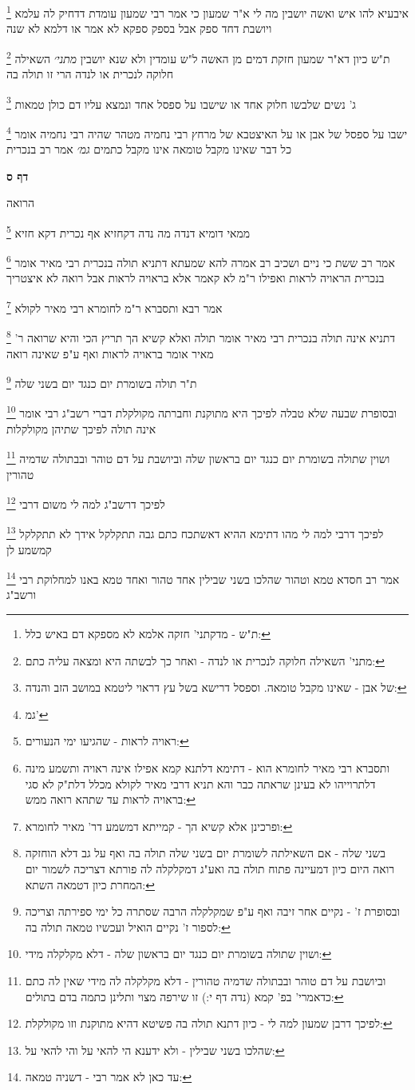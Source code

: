 \documentclass[12pt, openany]{book}
\newcommand{\sethebfont}{
\fontsize{10.5pt}{21.0pt} \selectfont
}
\newcommand{\twocol}[1]{
	{\sethebfont \begin{multicols}{2}
			#1
	\end{multicols}}	
}
\newcommand{\sectname}{}
\newcommand{\newsection}[1]{
	\renewcommand{\sectname}{#1}	
	\vspace{-\baselineskip}
	\begin{center}
		\textbf{%
\fontsize{16pt}{16pt}\selectfont
			#1}
	\end{center}
	\vspace{-\baselineskip}
	\nopagebreak
}
\newcommand{\footnotecomment}[1]{
	\renewcommand\thefootnote{}
	\footnote{#1}}
\newcommand{\commenta}[1]{\footnotecomment{#1}}
\begin{document}
{{\commenta{ת"ש - מדקתני' חזקה אלמא לא מספקא דם באיש כלל:}
איבעיא להו איש ואשה יושבין מה לי א"ר שמעון כי אמר רבי שמעון עומדת דדחיק לה עלמא ויושבת דחד ספק אבל בספק ספקא לא אמר או דלמא לא שנה 
\commenta{מתני' השאילה חלוקה לנכרית או לנדה - ואחר כך לבשתה היא ומצאה עליה כתם:}
ת"ש כיון דא"ר שמעון חזקת דמים מן האשה ל"ש עומדין ולא שנא יושבין
{\large\emph{מתני׳}} השאילה חלוקה לנכרית או לנדה הרי זו תולה בה
\commenta{של אבן - שאינו מקבל טומאה. וספסל דרישא בשל עץ דראוי ליטמא במושב הזב והנדה:}
ג' נשים שלבשו חלוק אחד או שישבו על ספסל אחד ונמצא עליו דם כולן טמאות 
\commenta{גמ'}
ישבו על ספסל של אבן או על האיצטבא של מרחץ רבי נחמיה מטהר שהיה רבי נחמיה אומר כל דבר שאינו מקבל טומאה אינו מקבל כתמים
{\large\emph{גמ׳}} אמר רב בנכרית
\clearpage}

\newsection{דף ס}
\twocol{הרואה 
\commenta{ראויה לראות - שהגיעו ימי הנעורים:}
ממאי דומיא דנדה מה נדה דקחזיא אף נכרית דקא חזיא 
\commenta{ותסברא רבי מאיר לחומרא הוא - דתימא דלתנא קמא אפילו אינה ראויה ותשמע מינה דלתרוייהו לא בעינן שראתה כבר והא תניא דרבי מאיר לקולא מכלל דלת"ק לא סגי בראויה לראות עד שתהא רואה ממש:}
אמר רב ששת כי ניים ושכיב רב אמרה להא שמעתא דתניא תולה בנכרית רבי מאיר אומר בנכרית הראויה לראות ואפילו ר"מ לא קאמר אלא בראויה לראות אבל רואה לא איצטריך 
\commenta{ופרכינן אלא קשיא הך - קמייתא דמשמע דר' מאיר לחומרא:
}
אמר רבא ותסברא ר"מ לחומרא רבי מאיר לקולא 
\commenta{בשני שלה - אם השאילתה לשומרת יום בשני שלה תולה בה ואף על גב דלא הוחזקה רואה היום כיון דמעיינה פתוח תולה בה ואע"ג דמקלקלה לה פורתא דצריכה לשמור יום המחרת כיון דטמאה השתא:}
דתניא אינה תולה בנכרית רבי מאיר אומר תולה ואלא קשיא הך תריץ הכי והיא שרואה ר' מאיר אומר בראויה לראות ואף ע"פ שאינה רואה 
\commenta{ובסופרת ז' - נקיים אחר זיבה ואף ע"פ שמקלקלה הרבה שסתרה כל ימי ספירתה וצריכה לספור ז' נקיים הואיל ועכשיו טמאה תולה בה:}
ת"ר תולה בשומרת יום כנגד יום בשני שלה
\commenta{ושוין שתולה בשומרת יום כנגד יום בראשון שלה - דלא מקלקלה מידי:}
ובסופרת שבעה שלא טבלה לפיכך היא מתוקנת וחברתה מקולקלת דברי רשב"ג רבי אומר אינה תולה לפיכך שתיהן מקולקלות 
\commenta{וביושבת על דם טוהר ובבתולה שדמיה טהורין - דלא מקלקלה לה מידי שאין לה כתם כדאמרי' בפ' קמא (נדה דף י:) זו שירפה מצוי ותלינן כתמה בדם בתולים:}
ושוין שתולה בשומרת יום כנגד יום בראשון שלה
וביושבת על דם טוהר ובבתולה שדמיה טהורין 
\commenta{לפיכך דרבן שמעון למה לי - כיון דתנא תולה בה פשיטא דהיא מתוקנת וזו מקולקלת:}
לפיכך דרשב"ג למה לי משום דרבי 
\commenta{שהלכו בשני שבילין - ולא ידענא הי להאי על והי להאי על:}
לפיכך דרבי למה לי מהו דתימא ההיא דאשתכח כתם גבה תתקלקל אידך לא תתקלקל קמשמע לן 
\commenta{עד כאן לא אמר רבי - דשניה טמאה:}
אמר רב חסדא טמא וטהור שהלכו בשני שבילין אחד טהור ואחד טמא באנו למחלוקת רבי ורשב"ג 
}}
\end{document}
